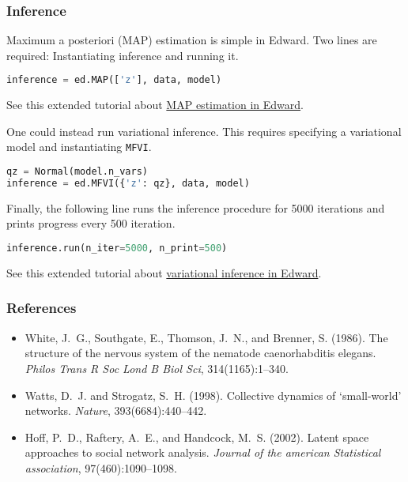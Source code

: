 \subsubsection{Inference}

Maximum a posteriori (MAP) estimation is simple in Edward. Two lines are
required: Instantiating inference and running it.
\begin{lstlisting}[language=Python]
inference = ed.MAP(['z'], data, model)
\end{lstlisting}

See this extended tutorial about
\href{tut_MAP}{MAP estimation in Edward}.

One could instead run variational inference. This requires specifying
a variational model and instantiating \texttt{MFVI}.
\begin{lstlisting}[language=Python]
qz = Normal(model.n_vars)
inference = ed.MFVI({'z': qz}, data, model)
\end{lstlisting}
Finally, the following line runs the inference procedure for 5000
iterations and prints progress every 500 iteration.
\begin{lstlisting}[language=Python]
inference.run(n_iter=5000, n_print=500)
\end{lstlisting}
See this extended tutorial about
\href{tut_variational_inference}{variational inference in Edward}.

\subsubsection{References}

\begin{itemize}
\item
White, J.~G., Southgate, E., Thomson, J.~N., and Brenner, S. (1986).
\newblock The structure of the nervous system of the nematode caenorhabditis
  elegans.
\newblock \emph{Philos Trans R Soc Lond B Biol Sci}, 314(1165):1--340.
\item
Watts, D.~J. and Strogatz, S.~H. (1998).
\newblock Collective dynamics of ‘small-world’ networks.
\newblock \emph{Nature}, 393(6684):440--442.
\item
Hoff, P.~D., Raftery, A.~E., and Handcock, M.~S. (2002).
\newblock Latent space approaches to social network analysis.
\newblock \emph{Journal of the american Statistical association},
  97(460):1090--1098.
\end{itemize}
